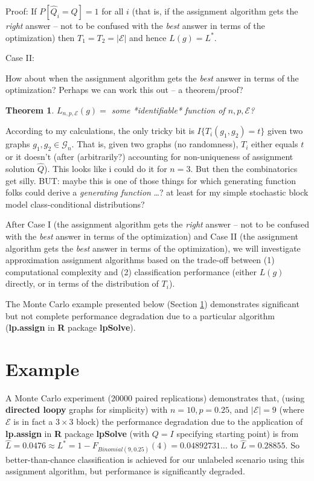\documentclass{article}
\newcommand{\mcE}{\mathcal{E}}
\newcommand{\mcG}{\mathcal{G}}
\newcommand{\hatQ}{\widehat{Q}}
\newcommand{\hatL}{\widehat{L}}
\newtheorem{thm}{Theorem}
\newcommand{\thma}{\begin{thm}}
\newcommand{\thmb}{\end{thm}}
\begin{document}
Proof:
If $P[\hatQ_i = Q]=1$ for all $i$
(that is, if the assignment algorithm gets the {\em right} answer --
not to be confused with the {\em best} answer
in terms of the optimization)
then $T_1=T_2=|\mcE|$ and hence $L(g)=L^*$.


Case II:

How about when the assignment algorithm gets the {\em best} answer
in terms of the optimization?
Perhaps we can work this out -- a theorem/proof?

\thma
$L_{n,p,\mcE}(g) =$ some *identifiable* function of $n,p,\mcE$?
\thmb

According to my calculations,
the only tricky bit is $I\{T_i(g_1,g_2) = t\}$
given two graphs $g_1,g_2 \in \mcG_n$.
That is, given two graphs (no randomness),
$T_i$ either equals $t$ or it doesn't
(after (arbitrarily?) accounting for non-uniqueness
of assignment solution $\hatQ$).
This looks like i could do it for $n=3$.
But then the combinatorics get silly.
BUT: maybe this is one of those things for which
generating function folks
could derive a {\em generating function} \dots?
at least for my simple stochastic block model
class-conditional distributions?


After Case I
(the assignment algorithm gets the {\em right} answer --
not to be confused with the {\em best} answer in terms of the optimization)
and Case II
(the assignment algorithm gets the {\em best} answer in terms of the optimization),
we will investigate approximation assignment algorithms based on the trade-off between
(1) computational complexity and
(2) classification performance
(either $L(g)$ directly, or in terms of the distribution of $T_i$).


The Monte Carlo example presented below (Section \ref{Example})
demonstrates significant but not complete performance degradation
due to a particular algorithm
({\bf lp.assign} in {\bf R} package {\bf lpSolve}).




\section{Example}\label{Example}

A Monte Carlo experiment (20000 paired replications) demonstrates that,
(using {\bf directed loopy} graphs for simplicity)
with $n=10, p=0.25$, and $|\mcE|=9$
(where $\mcE$ is in fact a $3 \times 3$ block)
the performance degradation due to the application of
{\bf lp.assign} in {\bf R} package {\bf lpSolve}
(with $Q=I$ specifying starting point)
is from
$\hatL = 0.0476 \approx L^* = 1-F_{Binomial(9,0.25)}(4) = 0.04892731\dots$
to
 $\hatL = 0.28855$.
So better-than-chance classification is achieved for our unlabeled scenario
using this assignment algorithm,
but performance is significantly degraded.
\end{document}
